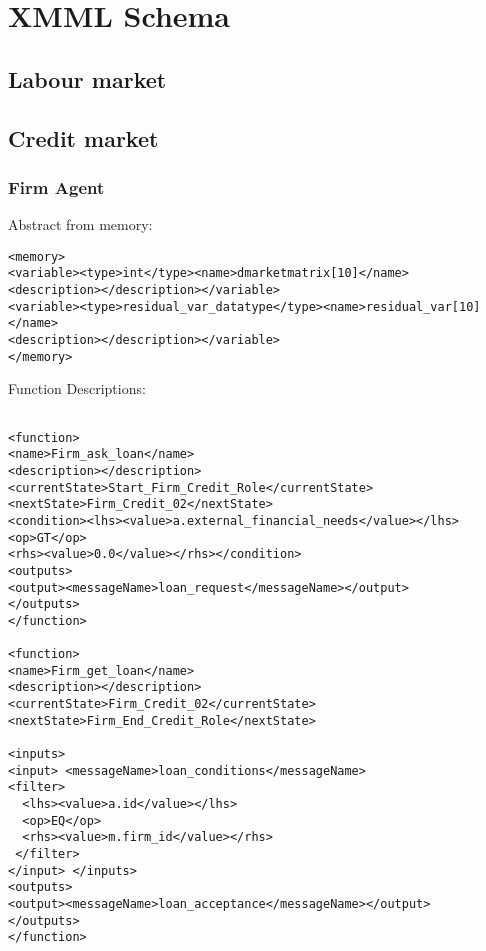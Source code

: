 \chapter{XMML Schema}\label{appendix}

\section{Labour market}
\section{Credit market}

\subsection{Firm Agent}
Abstract from memory:
\begin{mylisting}
\begin{verbatim}
<memory>
<variable><type>int</type><name>dmarketmatrix[10]</name>
<description></description></variable>
<variable><type>residual_var_datatype</type><name>residual_var[10]</name>
<description></description></variable>
</memory>
\end{verbatim}
\end{mylisting}

Function Descriptions:
\begin{mylisting}
\begin{verbatim}

<function>
<name>Firm_ask_loan</name>
<description></description>
<currentState>Start_Firm_Credit_Role</currentState>
<nextState>Firm_Credit_02</nextState>
<condition><lhs><value>a.external_financial_needs</value></lhs><op>GT</op>
<rhs><value>0.0</value></rhs></condition>
<outputs>
<output><messageName>loan_request</messageName></output>
</outputs>
</function>

<function>
<name>Firm_get_loan</name>
<description></description>
<currentState>Firm_Credit_02</currentState>
<nextState>Firm_End_Credit_Role</nextState>

<inputs>
<input> <messageName>loan_conditions</messageName>
<filter>
  <lhs><value>a.id</value></lhs>
  <op>EQ</op>
  <rhs><value>m.firm_id</value></rhs>
 </filter>
</input> </inputs>
<outputs>
<output><messageName>loan_acceptance</messageName></output>
</outputs>
</function>

\end{verbatim}
\end{mylisting}

